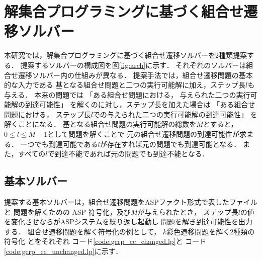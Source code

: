 \section{解集合プログラミングに基づく組合せ遷移ソルバー} \label{chap:proposal}


本研究では，解集合プログラミングに基づく組合せ遷移ソルバーを2種類提案する．
提案するソルバーの構成図を図\ref{fig:arch}に示す．
それぞれのソルバーは組合せ遷移ソルバー内の仕組みが異なる．
提案手法では，組合せ遷移問題の基本的な入力である
基となる組合せ問題と二つの実行可能解に加え，ステップ長$l$も与える．
本来の問題では
「ある組合せ問題における，
与えられた二つの実行可能解の到達可能性」
を解くのに対し，ステップ長を加えた場合は
「ある組合せ問題における，
ステップ長$l$での与えられた二つの実行可能解の到達可能性」
を解くことになる．
基となる組合せ問題の実行可能解の総数を$M$とすると，
$0 \le l \le M-1$として問題を解くことで
元の組合せ遷移問題の到達可能性が求まる．
一つでも到達可能である$l$が存在すれば元の問題でも到達可能となる．
また，すべての$l$で到達不能であれば元の問題でも到達不能となる．

\subsection{基本ソルバー} \label{sec:based_solver}

提案する基本ソルバーは，組合せ遷移問題をASPファクト形式で表したファイルと
問題を解くための ASP 符号化，及び$M$が与えられたとき，
ステップ長$l$の値を変化させならがASPシステムを繰り返し起動し
問題を解き到達可能性を出力する．
組合せ遷移問題を解く符号化の例として，
$k$彩色遷移問題を解く2種類の符号化
とをそれぞれ
コード\ref{code:gcrp_cc_changed.lp}と
コード\ref{code:gcrp_cc_unchanged.lp}に示す．





